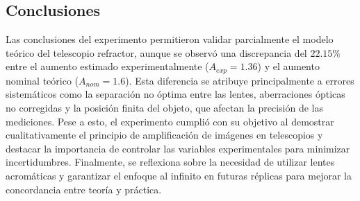 \documentclass[5p,letterpaper]{article}
\begin{document}
\subsection{Conclusiones}

Las conclusiones del experimento permitieron validar parcialmente el modelo teórico del telescopio refractor, aunque se observó una discrepancia del $22.15\%$ entre el aumento estimado experimentalmente ($A_{exp} =1.36$) y el aumento nominal teórico ($A_{nom}=1.6$). Esta diferencia se atribuye principalmente a errores sistemáticos como la separación no óptima entre las lentes, aberraciones ópticas no corregidas y la posición finita del objeto, que afectan la precisión de las mediciones. Pese a esto, el experimento cumplió con su objetivo al demostrar cualitativamente el principio de amplificación de imágenes en telescopios y destacar la importancia de controlar las variables experimentales para minimizar incertidumbres. Finalmente, se reflexiona sobre la necesidad de utilizar lentes acromáticas y garantizar el enfoque al infinito en futuras réplicas para mejorar la concordancia entre teoría y práctica.
\end{document}
